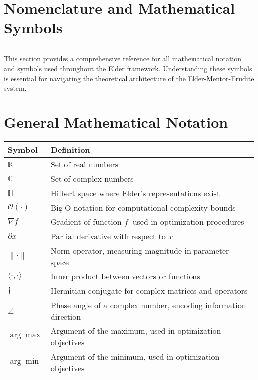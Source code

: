 \chapter*{Nomenclature and Mathematical Symbols}

\begin{center}
\rule{0.5\textwidth}{0.5pt}
\end{center}

\vspace{0.5cm}
\noindent This section provides a comprehensive reference for all mathematical notation and symbols used throughout the Elder framework. Understanding these symbols is essential for navigating the theoretical architecture of the Elder-Mentor-Erudite system.

\clearpage
\chapter*{General Mathematical Notation}

\begin{center}
\begin{tabular}{>{\centering\arraybackslash}p{3cm} p{10cm}}
\hline
\textbf{Symbol} & \textbf{Definition} \\
\hline
$\mathbb{R}$ & Set of real numbers \\
$\mathbb{C}$ & Set of complex numbers \\
$\mathbb{H}$ & Hilbert space where Elder's representations exist \\
$\mathcal{O}(\cdot)$ & Big-O notation for computational complexity bounds \\
$\nabla f$ & Gradient of function $f$, used in optimization procedures \\
$\partial x$ & Partial derivative with respect to $x$ \\
$\| \cdot \|$ & Norm operator, measuring magnitude in parameter space \\
$\langle \cdot, \cdot \rangle$ & Inner product between vectors or functions \\
$\dagger$ & Hermitian conjugate for complex matrices and operators \\
$\angle$ & Phase angle of a complex number, encoding information direction \\
$\arg\max$ & Argument of the maximum, used in optimization objectives \\
$\arg\min$ & Argument of the minimum, used in optimization objectives \\
\hline
\end{tabular}
\end{center}

